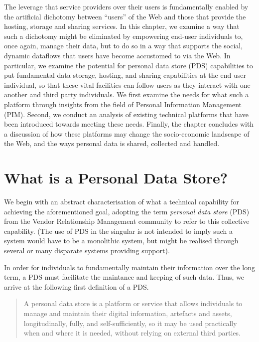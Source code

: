\documentclass[runningheads,a4paper]{llncs}
\begin{document}
The leverage that service providers over their users is fundamentally enabled by the artificial dichotomy between ``users'' of the Web and those that provide the hosting, storage and sharing services.  In this chapter, we examine a way that such a dichotomy might be eliminated by empowering end-user individuals to, once again, manage their data, but to do so in a way that supports the social, dynamic dataflows that users have become accustomed to via the Web.  In particular, we examine the potential for personal data store (PDS) capabilities to put fundamental data storage, hosting, and sharing capabilities at the end user individual, so that these vital facilities can follow users as they interact with one another and third party individuals.  We first examine the needs for what such a platform through insights from the field of Personal Information Management (PIM).  Second, we conduct an analysis of existing technical platforms  that have been introduced towards meeting these needs.  Finally, the chapter concludes with a discussion of how these platforms may change the socio-economic landscape of the Web, and the ways personal data is shared, collected and handled.

\section{What is a Personal Data Store?}

We begin with an abstract characterisation of what a technical capability for achieving the aforementioned goal, adopting the term  \emph{personal data store} (PDS) from the Vendor Relationship Management community \cite{vrm} to refer to this collective capability. (The use of PDS in the singular is not intended to imply such a system would have to be a monolithic system, but might be realised through several or many disparate systems providing support).

In order for individuals to fundamentally maintain their information over the long term, a PDS must facilitate the maintance and keeping of such data. Thus, we arrive at the following first definition of a PDS.

\begin{quote}

	A personal data store is a platform or service that allows individuals to manage and maintain their digital information, artefacts and assets, longitudinally, fully, and self-sufficiently, so it may be used practically when and where it is needed, without relying on external third parties. 

\end{quote}
\end{document}
